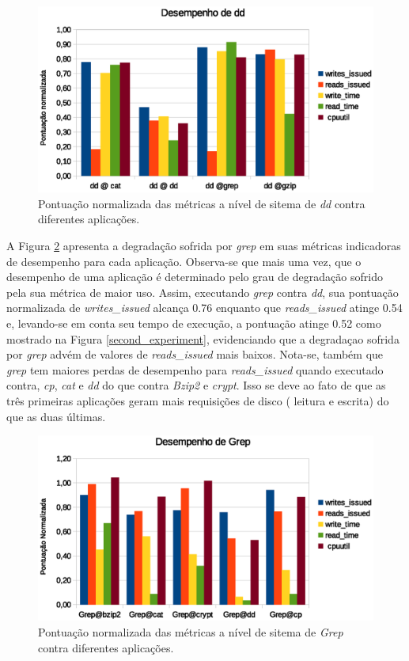 \begin{figure}[H]
\centering
\includegraphics [keepaspectratio=true,scale=0.7]{graficos/dd_performance.eps}
\caption{Pontuação normalizada das métricas a nível de sitema de \textit{dd} contra diferentes aplicações.}
\label{dd_performance}
\end{figure}  


A Figura \ref{grep_performance} apresenta a degradação sofrida por \textit{grep} em suas métricas indicadoras de desempenho para cada aplicação. Observa-se que mais uma vez, que o desempenho de uma aplicação é determinado pelo grau de degradação sofrido pela sua métrica de maior uso. Assim, executando \textit{grep} contra \textit{dd}, sua pontuação normalizada de \textit{writes\_issued} alcança 0.76 enquanto que \textit{reads\_issued} atinge 0.54 e, levando-se em conta seu tempo de execução, a pontuação atinge 0.52 como mostrado na Figura \ref{second_experiment}, evidenciando que a degradaçao sofrida por \textit{grep} advém de valores de \textit{reads\_issued} mais baixos. Nota-se, também que \textit{grep} tem maiores perdas de desempenho para \textit{reads\_issued} quando executado contra, \textit{cp}, \textit{cat} e \textit{dd} do que contra \textit{Bzip2} e \textit{crypt}. Isso se deve ao fato de que as três primeiras aplicações geram mais requisições de disco ( leitura e escrita) do que as duas últimas.

\begin{figure}[H]
\centering
\includegraphics [keepaspectratio=true,scale=0.8]{graficos/grep_performance.eps}
\caption{Pontuação normalizada das métricas a nível de sitema de \textit{Grep} contra diferentes aplicações.}
\label{grep_performance}
\end{figure}   

